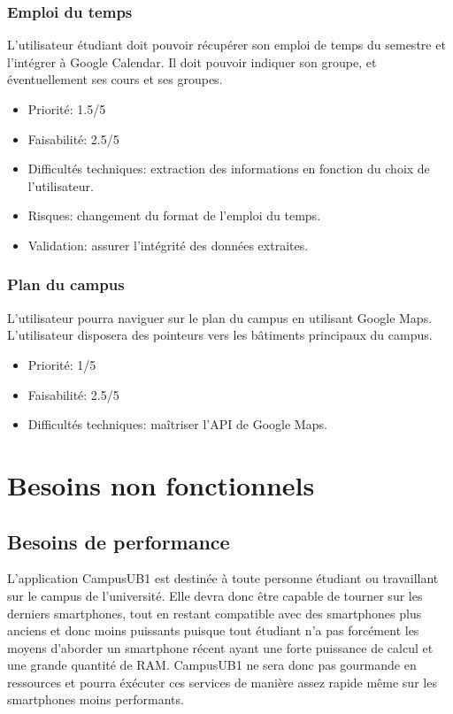 \documentclass [pdftex,12pt] {report}
\begin{document}
\subsubsection{Emploi du temps}
L'utilisateur étudiant doit pouvoir récupérer son emploi de temps du semestre et l'intégrer à Google Calendar. Il doit pouvoir indiquer son groupe, et éventuellement ses cours et ses groupes.

\begin{itemize}
\renewcommand{\labelitemi}{$\bullet$}
\item Priorité: 1.5/5
\item Faisabilité: 2.5/5
\item Difficultés techniques: extraction des informations en fonction du choix de l'utilisateur.
\item Risques: changement du format de l'emploi du temps.
\item Validation: assurer l'intégrité des données extraites.
\end{itemize}

\subsubsection{Plan du campus}
L'utilisateur pourra naviguer sur le plan du campus en utilisant Google Maps. L'utilisateur disposera des pointeurs vers les bâtiments principaux du campus. 

\begin{itemize}
\renewcommand{\labelitemi}{$\bullet$}
\item Priorité: 1/5
\item Faisabilité: 2.5/5
\item Difficultés techniques: maîtriser l'API de Google Maps.
\end{itemize}





\section{Besoins non fonctionnels}
\subsection{Besoins de performance}
L'application CampusUB1 est destinée à toute personne étudiant ou travaillant sur le campus de l'université. Elle devra donc être capable de tourner sur les derniers smartphones, tout en restant compatible avec des smartphones plus anciens et donc moins puissants puisque tout étudiant n'a pas forcément les moyens d'aborder un smartphone récent ayant une forte puissance de calcul et une grande quantité de RAM. CampusUB1 ne sera donc pas gourmande en ressources et pourra éxécuter ces services de manière assez rapide même sur les smartphones moins performants. 
\end{document}
